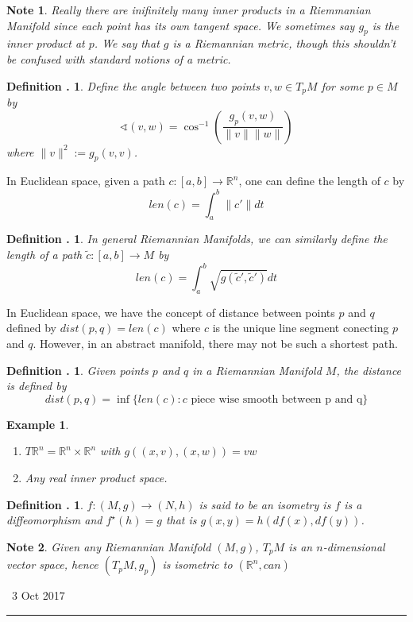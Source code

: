 \documentclass[twoside]{report}
\newcommand{\R}{\mathbb{R}}
\newcommand{\cleanbr}{\vspace{1ex}\noindent}
\newcommand{\ang}{\sphericalangle}
\newcounter{Lecture}
\newcommand{\newLec}[1]{
  \stepcounter{Lecture}
  \noindent{\Large\bf Lecture \arabic{Lecture}} \, #1 \hfill  \rule[1ex]{2.5in}{.1pt} \vspace{1em}
}
\theoremstyle{myts}
\newcounter{c}[Lecture]
\newtheorem{dfn}[c]{Definition \arabic{Lecture}.}
\newtheorem*{epl}{Example}
\newtheorem*{nte}{Note}
\newcounter{ex}[Lecture]
\begin{document}
\begin{nte}
  Really there are inifinitely many inner products in a Riemmanian Manifold since each point has its own tangent space. We sometimes say $g_p$ is the inner product at $p$. We say that $g$ is a \emph{Riemannian metric}, though this shouldn't be confused with standard notions of a metric.
\end{nte}

\begin{dfn}
  Define the \emph{angle} between two points \(v,w\in T_pM\) for some \(p\in M\) by
  \[
    \ang(v,w) = \cos^{-1} \left( \frac{g_p(v,w)}{\| v\| \| w\|}\right)
  \]
  where \(\|v\|^2 := g_p(v,v) \).
\end{dfn}

\cleanbr
In Euclidean space, given a path \( c: [a,b] \to \R^n \), one can define the  length of $c$ by
\[
  len(c) = \int_a^b \| c' \| dt
\]

\begin{dfn}
In general Riemannian Manifolds, we can similarly define the \emph{length} of a path \(\tilde{c} : [a,b] \to M \) by
\[
  len(c) = \int_a^b \sqrt{g(\tilde{c}', \tilde{c}')} dt
\]
\end{dfn}

\cleanbr
In Euclidean space, we have the concept of distance between points $p$ and $q$ defined by \(dist(p,q) = len(c) \) where $c$ is the unique line segment conecting $p$ and $q$. However, in an abstract manifold, there may not be such a shortest path.

\begin{dfn}
  Given points $p$ and $q$ in a Riemannian Manifold $M$, the \emph{distance} is defined by
  \[
    dist(p,q) = \inf\{len(c) : c \textrm{ piece wise smooth between p and q} \}
  \]
\end{dfn}

\begin{epl}
  \cleanbr
  \begin{enumerate}
    \item \(T\R^n = \R^n \times \R^n\) with \(g((x,v),(x,w))= vw\)
    \item Any real inner product space.
  \end{enumerate}
\end{epl}

\begin{dfn}
  \(f:(M,g)\to (N,h)\) is said to be an \emph{isometry} is $f$ is a diffeomorphism and \(f^{\star} (h) = g\) that is \( g(x,y) = h(df(x), df(y))\).
\end{dfn}

\begin{nte}
  Given any Riemannian Manifold \( (M,g) \), \( T_p M\) is an $n$-dimensional vector space, hence \( (T_pM, g_p) \) is isometric to \( (\R^n, can)\)
\end{nte}

\newLec{3 Oct 2017}
\end{document}
